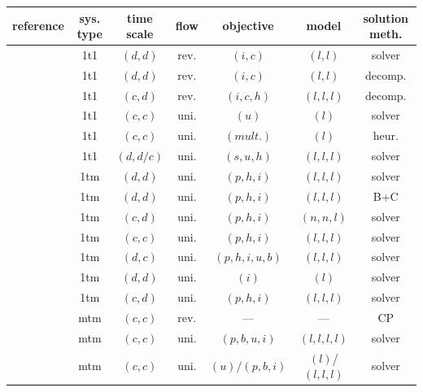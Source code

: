\begin{tabular*}{\textwidth}{L{3cm} @{\extracolsep{\fill}}cccccc}
\toprule
reference 			& sys. type 	& time scale 	& flow 	& objective & model		& solution meth. \\\midrule
\cite{Magatao2004} 	&	1t1			& $(d,d)$			& rev.	& $(i,c)$ 	& $(l,l)$		& solver	\\
\cite{Magatao2005}	&	1t1			& $(d,d)$			& rev.	& $(i,c)$ 	& $(l,l)$		& decomp.	\\
\cite{Magatao2011}	&	1t1			& $(c,d)$			& rev.	& $(i,c,h)$ 	& $(l,l,l)$	& decomp.	\\
\cite{Relvas2006} 	&	1t1			& $(c,c)$			& uni.	& $(u)$ 		& $(l)$		& solver\\
\cite{Relvas2009}	&	1t1			& $(c,c)$			& uni.	& $(mult.)$ 	& $(l)$		& heur.\\
\cite{Relvas2013}	&	1t1			& $(d,d/c)$			& uni.	& $(s,u,h)$ 	& $(l,l,l)$	& solver\\\midrule
%
\cite{Rejowski2003}	& 	1tm			& $(d,d)$			& uni.	& $(p,h,i)$	& $(l,l,l)$	& solver\\
\cite{Rejowski2004}	& 	1tm			& $(d,d)$			& uni.	& $(p,h,i)$	& $(l,l,l)$	& B+C\\
\cite{Rejowski2008}	& 	1tm			& $(c,d)$			& uni.	& $(p,h,i)$	& $(n,n,l)$	& solver\\
%
\cite{Cafaro2004}	&	1tm			& $(c,c)$			& uni.	& $(p,h,i)$	& $(l,l,l)$	& solver\\
\cite{Cafaro2008}	&	1tm			& $(d,c)$			& uni.	& $(p,h,i,u,b)$	& $(l,l,l)$	& solver\\
%
\cite{MirHassani2008}	&	1tm		& $(d,d)$			& uni.	& $(i)$			&	$(l)$		& solver\\
\cite{MirHassani2011}	&	1tm		& $(c,d)$			& uni.	& $(p,h,i)$		&	$(l,l,l)$	& solver\\\midrule
%
\cite{Moura2008}		&	mtm		& $(c,c)$			& rev. 	& --- 			&	---		& CP\\
\cite{Cafaro2009}		& 	mtm 	& $(c,c)$			& uni.	& $(p,b,u,i)$		&	$(l,l,l,l)$ & solver\\
\cite{Cafaro2010}		& 	mtm 	& $(c,c)$			& uni.	& $(u)/(p,b,i)$	&	$(l)$/$(l,l,l)$ & solver\\
\bottomrule
\end{tabular*}
